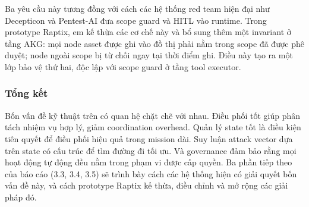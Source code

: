 Ba yêu cầu này tương đồng với cách các hệ thống red team hiện đại như Decepticon và Pentest-AI đưa scope guard và HITL vào runtime. Trong prototype Raptix, em kế thừa các cơ chế này và bổ sung thêm một invariant ở tầng AKG: mọi node asset được ghi vào đồ thị phải nằm trong scope đã được phê duyệt; node ngoài scope bị từ chối ngay tại thời điểm ghi. Điều này tạo ra một lớp bảo vệ thứ hai, độc lập với scope guard ở tầng tool executor.

\subsubsection*{Tổng kết}

Bốn vấn đề kỹ thuật trên có quan hệ chặt chẽ với nhau. Điều phối tốt giúp phân tách nhiệm vụ hợp lý, giảm coordination overhead. Quản lý state tốt là điều kiện tiên quyết để điều phối hiệu quả trong mission dài. Suy luận attack vector dựa trên state có cấu trúc để tìm đường đi tối ưu. Và governance đảm bảo rằng mọi hoạt động tự động đều nằm trong phạm vi được cấp quyền. Ba phần tiếp theo của báo cáo (3.3, 3.4, 3.5) sẽ trình bày cách các hệ thống hiện có giải quyết bốn vấn đề này, và cách prototype Raptix kế thừa, điều chỉnh và mở rộng các giải pháp đó.